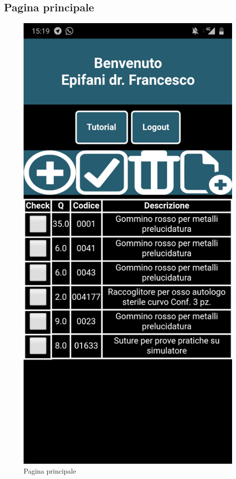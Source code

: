 \newpage

\subsection{Pagina principale}

\begin{figure}[h]
	\centering
	\includegraphics[width=.3\textwidth]{./img/homepage.jpg}
	\caption{Pagina principale}
\end{figure}

